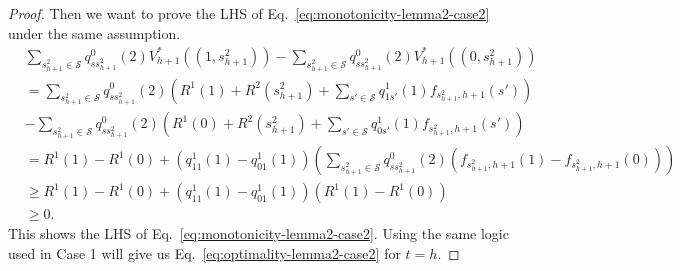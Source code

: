 \begin{proof}
Then we want to prove the LHS of Eq.~\eqref{eq:monotonicity-lemma2-case2} under the same assumption.
 \begin{align*}
       & \sum_{s_{h+1}^2\in\mathcal{S}}q^0_{ss_{h+1}^2}(2)V_{h+1}^*\left(\left(1,s_{h+1}^2\right)\right)-\sum_{s_{h+1}^2\in\mathcal{S}}q^0_{ss_{h+1}^2}(2)V_{h+1}^*\left(\left(0,s_{h+1}^2\right)\right)\\
       &=\sum_{s_{h+1}^2\in\mathcal{S}}q^0_{ss_{h+1}^2}(2)\left(R^1(1)+R^2(s_{h+1}^2)+\sum_{s'\in\mathcal{S}}q^1_{1s'}(1)f_{s_{h+1}^2,h+1}(s')\right)\\
       &-\sum_{s_{h+1}^2\in\mathcal{S}}q^0_{ss_{h+1}^2}(2)\left(R^1(0)+R^2(s_{h+1}^2)+\sum_{s'\in\mathcal{S}}q^1_{0s'}(1)f_{s_{h+1}^2,h+1}(s')\right)\\
       &=R^1(1)-R^1(0)+\left(q^1_{11}(1)-q^1_{01}(1)\right)\left(\sum_{s_{h+1}^2\in\mathcal{S}}q^0_{ss_{h+1}^2}(2)\left(f_{s_{h+1}^2,h+1}(1)-f_{s_{h+1}^2,h+1}(0)\right)\right)\\
       &\geq R^1(1)-R^1(0)+\left(q^1_{11}(1)-q^1_{01}(1)\right)\left(R^1(1)-R^1(0)\right)\\
       &\geq 0.
    \end{align*}
    This shows the LHS of Eq.~\eqref{eq:monotonicity-lemma2-case2}. Using the same logic used in Case 1 will give us Eq.~\eqref{eq:optimality-lemma2-case2} for $t=h$.
\end{proof}
